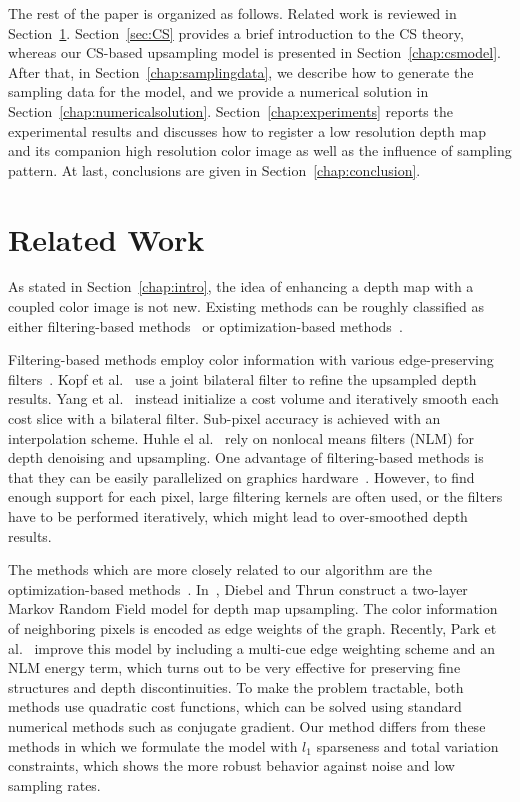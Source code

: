 \documentclass[preprint,10pt,5p,times,twocolumn]{elsarticle}
\begin{document}
The rest of the paper is organized as follows. Related work is reviewed in Section~\ref{chap:relatedwork}. Section~\ref{sec:CS} provides a brief introduction to the CS theory, whereas our CS-based upsampling model is presented in Section~\ref{chap:csmodel}. After that, in Section~\ref{chap:samplingdata}, we describe how to generate the sampling data for the model, and we provide a numerical solution in Section~\ref{chap:numericalsolution}. Section~\ref{chap:experiments} reports the experimental results and discusses how to register a low resolution depth map and its companion high resolution color image as well as the influence of sampling pattern. At last, conclusions are given in Section~\ref{chap:conclusion}.


\section{Related Work}
\label{chap:relatedwork}
As stated in Section~\ref{chap:intro}, the idea of enhancing a depth map with a coupled color image is not new. Existing methods can be roughly classified as either filtering-based methods~\cite{KCLU07,YYDN07,CBTT08,HSJS10} or optimization-based methods~\cite{DT05,PKTBK11}.

Filtering-based methods employ color information with various edge-preserving filters~\cite{TM98,BCM05}. Kopf et al.~\cite{KCLU07} use a joint bilateral filter to refine the upsampled depth results. Yang et al.~\cite{YYDN07} instead initialize a cost volume and iteratively smooth each cost slice with a bilateral filter. Sub-pixel accuracy is achieved with an interpolation scheme. Huhle el al.~\cite{HSJS10} rely on nonlocal means filters (NLM) for depth denoising and upsampling. One advantage of filtering-based methods is that they can be easily parallelized on graphics hardware~\cite{CBTT08,HSJS10}. However, to find enough support for each pixel, large filtering kernels are often used, or the filters have to be performed iteratively, which might lead to over-smoothed depth results.

The methods which are more closely related to our algorithm are the optimization-based methods~\cite{DT05,PKTBK11}. In~\cite{DT05}, Diebel and Thrun construct a two-layer Markov Random Field model for depth map upsampling. The color information of neighboring pixels is encoded as edge weights of the graph. Recently, Park et al.~\cite{PKTBK11} improve this model by including a multi-cue edge weighting scheme and an NLM energy term, which turns out to be very effective for preserving fine structures and depth discontinuities. To make the problem tractable, both methods use quadratic cost functions, which can be solved using standard numerical methods such as conjugate gradient. Our method differs from these methods in which we formulate the model with $l_{1}$ sparseness and total variation constraints, which shows the more robust behavior against noise and low sampling rates.
\end{document}
